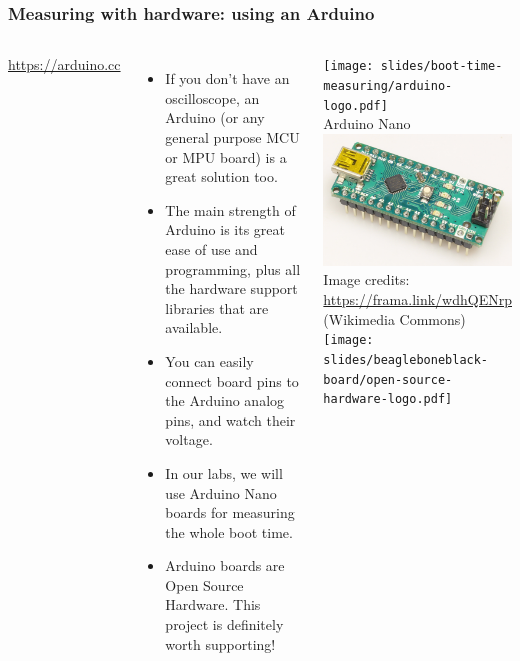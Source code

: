 \begin{frame}
\frametitle{Measuring with hardware: using an Arduino}
\begin{columns}
  \url{https://arduino.cc}
  \begin{itemize}
  \item If you don't have an oscilloscope, an Arduino (or any general
        purpose MCU or MPU board) is a great solution too.
  \item The main strength of Arduino is its great ease of use and
        programming, plus all the hardware support libraries that are available.
  \item You can easily connect board pins to the Arduino analog pins, and
        watch their voltage.
  \item In our labs, we will use Arduino Nano boards for measuring the
        whole boot time.
  \item Arduino boards are Open Source Hardware. This project is
      definitely worth supporting!
  \end{itemize}
  \begin{center}
  \tiny
  \texttt{[image: slides/boot-time-measuring/arduino-logo.pdf]}\\
  \vspace{1cm}
  Arduino Nano\\
  \includegraphics[width=\textwidth]{slides/boot-time-measuring/arduino-nano.jpg}\\
  Image credits: \url{https://frama.link/wdhQENrp} (Wikimedia Commons)\\
  \vspace{1cm}
  \texttt{[image: slides/beagleboneblack-board/open-source-hardware-logo.pdf]}
  \end{center}
\end{columns}
\end{frame}

